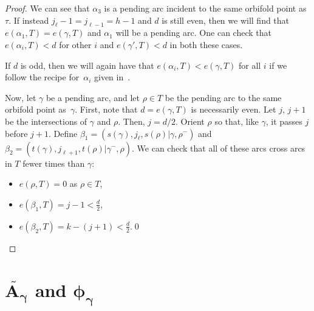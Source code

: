 \documentclass[pdftex]{sigma}%
\numberwithin{equation}{section}
\begin{document}
\begin{proof}
We can see that $\alpha_3$ is a pending arc incident to the same orbifold point as $\tau$. If instead $j_{\ell} - 1 = j_{\ell - 1} = h-1$ and $d$ is still even, then we will find that $e(\alpha_1, T) = e(\gamma,T)$ and $\alpha_1$ will be a pending arc. One can check that $e(\alpha_i,T) < d$ for other $i$ and $e(\gamma',T) < d$ in both these cases.

\begin{center}
\end{center}

If $d$ is odd, then we will again have that $e(\alpha_i,T) < e(\gamma,T)$ for all $i$ if we follow the recipe for~$\alpha_i$ given in~\cite{MSW}.

Now, let $\gamma$ be a pending arc, and let $\rho \in T$ be the pending arc to the same orbifold point as~$\gamma$. First, note that $d = e(\gamma,T)$ is necessarily even. Let $j$, $j+1$ be the intersections of $\gamma$ and $\rho$. Then, $j = d/2$. Orient $\rho$ so that, like $\gamma$, it passes $j$ before $j + 1$. Define $\beta_1 = (s(\gamma), j_\ell, s(\rho) \vert \gamma, \rho^-)$ and $\beta_2 = (t(\gamma), j_{\ell + 1}, t(\rho) \vert \gamma^-, \rho)$. We can check that all of these arcs cross arcs in $T$ fewer times than $\gamma$:
\begin{itemize}\itemsep=0pt
\item $e(\rho, T) = 0$ as $\rho \in T$,
\item $e(\beta_1, T) = j - 1 < \frac{d}{2}$,
\item $e(\beta_2, T) = k - (j+1) < \frac{d}{2}$.\hfill \qed
\end{itemize}\renewcommand{\qed}{}
\end{proof}

\section[$\widetilde{A_\gamma}$ and $\phi_\gamma$]{$\boldsymbol{\widetilde{A_\gamma}}$ and $\boldsymbol{\phi_\gamma}$} \label{Sec:mapSection}
\end{document}
